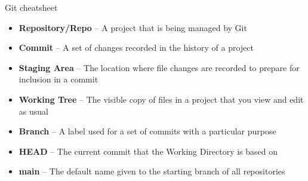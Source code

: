 \documentclass[9pt]{extarticle}
\def\itempad{-1pt}
\begin{document}
\thispagestyle{empty}

\begin{center}
  {\LARGE
  Git cheatsheet}
\end{center}

\begin{bluebox}[title=Git Glossary]
  \begin{itemize}
    \itemsep\itempad
  \item \textbf{Repository/Repo} -- A project that is being managed by Git
  \item \textbf{Commit} -- A set of changes recorded in the history of
    a project
  \item \textbf{Staging Area} -- The location where file changes are recorded to
    prepare for inclusion in a commit
  \item \textbf{Working Tree} -- The visible copy of files in a project that you view
    and edit as usual
  \item \textbf{Branch} -- A label used for a set of commits with a particular
    purpose
  \item \textbf{HEAD} -- The current commit that the Working Directory is based on
  \item \textbf{main} -- The default name given to the starting branch of all repositories
  \end{itemize}
\end{bluebox}
\end{document}
